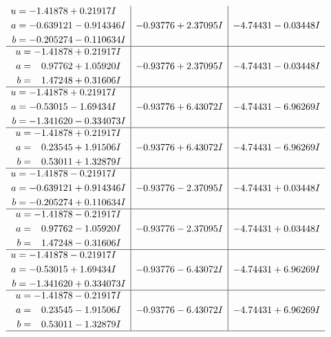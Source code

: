 \documentclass[1p]{elsarticle_modified}
\theoremstyle{definition}
\begin{document}
$$\begin{array}{c|c|c}
\begin{aligned}
u &= -1.41878 + 0.21917 I \\
a &= -0.639121 - 0.914346 I \\
b &= -0.205274 - 0.110634 I\end{aligned}
 & -0.93776 + 2.37095 I & -4.74431 - 0.03448 I \\ \hline\begin{aligned}
u &= -1.41878 + 0.21917 I \\
a &= \phantom{-}0.97762 + 1.05920 I \\
b &= \phantom{-}1.47248 + 0.31606 I\end{aligned}
 & -0.93776 + 2.37095 I & -4.74431 - 0.03448 I \\ \hline\begin{aligned}
u &= -1.41878 + 0.21917 I \\
a &= -0.53015 - 1.69434 I \\
b &= -1.341620 - 0.334073 I\end{aligned}
 & -0.93776 + 6.43072 I & -4.74431 - 6.96269 I \\ \hline\begin{aligned}
u &= -1.41878 + 0.21917 I \\
a &= \phantom{-}0.23545 + 1.91506 I \\
b &= \phantom{-}0.53011 + 1.32879 I\end{aligned}
 & -0.93776 + 6.43072 I & -4.74431 - 6.96269 I \\ \hline\begin{aligned}
u &= -1.41878 - 0.21917 I \\
a &= -0.639121 + 0.914346 I \\
b &= -0.205274 + 0.110634 I\end{aligned}
 & -0.93776 - 2.37095 I & -4.74431 + 0.03448 I \\ \hline\begin{aligned}
u &= -1.41878 - 0.21917 I \\
a &= \phantom{-}0.97762 - 1.05920 I \\
b &= \phantom{-}1.47248 - 0.31606 I\end{aligned}
 & -0.93776 - 2.37095 I & -4.74431 + 0.03448 I \\ \hline\begin{aligned}
u &= -1.41878 - 0.21917 I \\
a &= -0.53015 + 1.69434 I \\
b &= -1.341620 + 0.334073 I\end{aligned}
 & -0.93776 - 6.43072 I & -4.74431 + 6.96269 I \\ \hline\begin{aligned}
u &= -1.41878 - 0.21917 I \\
a &= \phantom{-}0.23545 - 1.91506 I \\
b &= \phantom{-}0.53011 - 1.32879 I\end{aligned}
 & -0.93776 - 6.43072 I & -4.74431 + 6.96269 I\\
 \hline 
 \end{array}$$\newpage\newpage\renewcommand{\arraystretch}{1}
\end{document}
